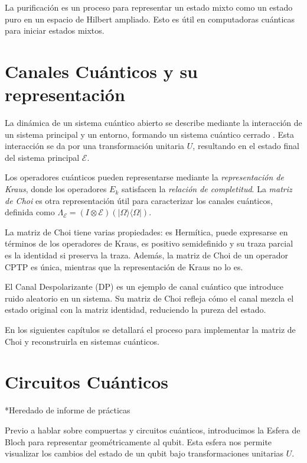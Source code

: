 \documentclass[letterpaper,12pt]{thesisECFM}
\theoremstyle{plain}
\theoremstyle{definition}
\theoremstyle{remark}
\newcommand{\1}{\mathbb{1}}
\begin{document}
La purificación es un proceso para representar un estado mixto como un estado puro en un espacio de Hilbert ampliado. Esto es útil en computadoras cuánticas para iniciar estados mixtos. \par 



\section{Canales Cuánticos y su representación}
La dinámica de un sistema cuántico abierto se describe mediante la interacción de un sistema principal y un entorno, formando un sistema cuántico cerrado \cite{nielsen_chuang_2011}. Esta interacción se da por una transformación unitaria $U$, resultando en el estado final del sistema principal $\mathcal{E}$. \par 

Los operadores cuánticos pueden representarse mediante la \textit{representación de Kraus}, donde los operadores ${E_k}$ satisfacen la \textit{relación de completitud}. La \textit{matriz de Choi} es otra representación útil para caracterizar los canales cuánticos, definida como $\Lambda_{\mathcal{E}} = (I \otimes \mathcal{E})(|\Omega\rangle\langle\Omega|)$. \par 

La matriz de Choi tiene varias propiedades: es Hermítica, puede expresarse en términos de los operadores de Kraus, es positivo semidefinido y su traza parcial es la identidad si preserva la traza. Además, la matriz de Choi de un operador CPTP es única, mientras que la representación de Kraus no lo es. \par 

El Canal Despolarizante (DP) es un ejemplo de canal cuántico que introduce ruido aleatorio en un sistema. Su matriz de Choi refleja cómo el canal mezcla el estado original con la matriz identidad, reduciendo la pureza del estado. \par 

En los siguientes capítulos se detallará el proceso para implementar la matriz de Choi y reconstruirla en sistemas cuánticos. \par 
\section{Circuitos Cuánticos}
*Heredado de informe de prácticas 

Previo a hablar sobre compuertas y circuitos cuánticos, introducimos la Esfera de Bloch para representar geométricamente al qubit. Esta esfera nos permite visualizar los cambios del estado de un qubit bajo transformaciones unitarias $U$. \par 
\end{document}
